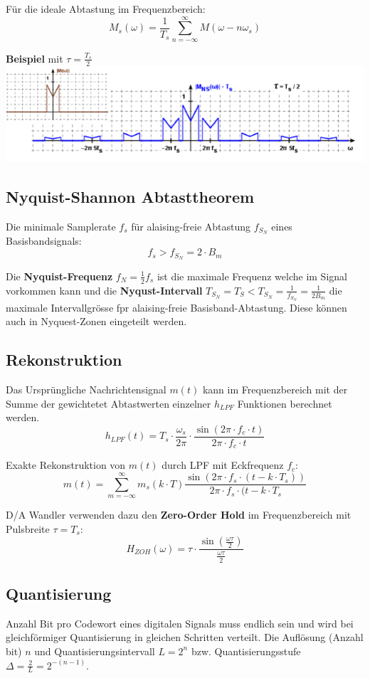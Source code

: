 Für die ideale Abtastung im Frequenzbereich:
\[
M_s(\omega) = \frac{1}{T_s}\sum_{n=-\infty}^{\infty}M(\omega -n\omega_s)
\]

\textbf{Beispiel} mit $\tau = \frac{T_s}{2}$\\
\includegraphics[width=\columnwidth]{Images/natural_freq}

\subsection{Nyquist-Shannon Abtasttheorem}
Die minimale Samplerate $f_s$ für alaising-freie Abtastung $f_{S_N}$ eines Basisbandsignals:
\[
f_s > f_{S_N} = 2 \cdot B_m
\]

Die \textbf{Nyquist-Frequenz} $f_N = \frac{1}{2}f_s$ ist die maximale Frequenz welche im Signal vorkommen kann und die \textbf{Nyqust-Intervall} $T_{S_N} = T_S < T_{S_N} = \frac{1}{f_{S_N}} = \frac{1}{2B_m}$ die maximale Intervallgrösse fpr alaising-freie Basisband-Abtastung. Diese können auch in Nyquest-Zonen eingeteilt werden.

\subsection{Rekonstruktion}
Das Ursprüngliche Nachrichtensignal $m(t)$ kann im Frequenzbereich mit der Summe der gewichtetet Abtastwerten einzelner $h_{LPF}$ Funktionen berechnet werden. 
\[
h_{LPF}(t) = T_s \cdot \frac{\omega_s}{2\pi}\cdot\frac{\sin(2\pi\cdot f_c \cdot t)}{2\pi\cdot f_c \cdot t}
\]

Exakte Rekonstruktion von $m(t)$ durch LPF mit Eckfrequenz $f_c$:
\[
m(t) = \sum_{m=-\infty}^{\infty}m_s(k\cdot T)\frac{\sin(2\pi \cdot f_s \cdot (t -k\cdot T_s))}{2\pi \cdot f_s \cdot (t -k\cdot T_s}
\]


D/A Wandler verwenden dazu den \textbf{Zero-Order Hold} im Frequenzbereich mit Pulsbreite $\tau = T_s$:
\[
H_{ZOH}(\omega) = \tau \cdot \frac{\sin(\frac{\omega\tau}{2})}{\frac{\omega\tau}{2}}
\]


\subsection{Quantisierung}
Anzahl Bit pro Codewort eines digitalen Signals muss endlich sein und wird bei gleichförmiger Quantisierung in gleichen Schritten verteilt. Die Auflösung (Anzahl bit) $n$ und Quantisierungsintervall $L = 2^n$ bzw. Quantisierungsstufe $\Delta = \frac{2}{L} = 2^{-(n-1)}$.

